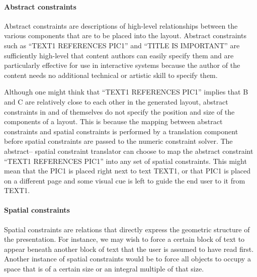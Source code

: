      \paragraph{Abstract constraints}

      Abstract constraints are descriptions of high-level relationships between
      the various components that are to be placed into the layout. Abstract
      constraints such as “TEXT1 REFERENCES PIC1” and “TITLE IS IMPORTANT” are
      sufficiently high-level that content authors can easily specify them and
      are particularly effective for use in interactive systems because the
      author of the content needs no additional technical or artistic skill to
      specify them.

      Although one might think that “TEXT1 REFERENCES PIC1” implies that B and C
      are relatively close to each other in the generated layout, abstract
      constraints in and of themselves do not specify the position and size of
      the components of a layout. This is because the mapping between abstract
      constraints and spatial constraints is performed by a translation component
      before spatial constraints are passed to the numeric constraint solver. The
      abstract– spatial constraint translator can choose to map the abstract
      constraint “TEXT1 REFERENCES PIC1” into any set of spatial constraints.
      This might mean that the PIC1 is placed right next to text TEXT1, or that
      PIC1 is placed on a different page and some visual cue is left to guide the
      end user to it from TEXT1.

     \paragraph{Spatial constraints}
      \label{spatialcon}

      Spatial constraints are relations that directly express the geometric
      structure of the presentation. For instance, we may wish to force a certain
      block of text to appear beneath another block of text that the user is
      assumed to have read first. Another instance of spatial constraints would
      be to force all objects to occupy a space that is of a certain size or an
      integral multiple of that size.

